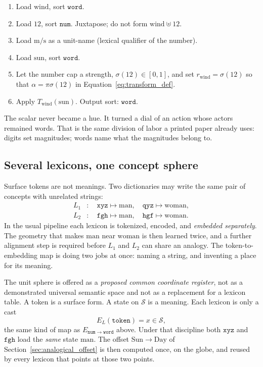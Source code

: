 \documentclass[12pt, a4paper]{article}
\begin{document}
\begin{enumerate}
    \item Load $\mathrm{wind}$, sort $\mathtt{word}$.
    \item Load $12$, sort $\mathtt{num}$. Juxtapose; do not form
          $\mathrm{wind}\uplus 12$.
    \item Load $\mathrm{m/s}$ as a unit-name (lexical qualifier of the
          number).
    \item Load $\mathrm{sun}$, sort $\mathtt{word}$.
    \item Let the number cap a strength,
          $\sigma(12)\in[0,1]$, and set
          $r_{\mathrm{wind}}=\sigma(12)$ so that
          $\alpha=\pi\sigma(12)$ in Equation~\eqref{eq:transform_def}.
    \item Apply $T_{\mathrm{wind}}(\mathrm{sun})$. Output sort:
          $\mathtt{word}$.
\end{enumerate}
The scalar never became a hue. It turned a dial of an action whose
actors remained words. That is the same division of labor a printed
paper already uses: digits set magnitudes; words name what the
magnitudes belong to.

\subsection{Several lexicons, one concept sphere}
\label{subsec:shared_lexicons}
Surface tokens are not meanings. Two dictionaries may write the same
pair of concepts with unrelated strings:
\begin{equation}
    \begin{aligned}
        L_1&: \quad \texttt{xyz}\mapsto\mathrm{man},\quad
                    \texttt{qyz}\mapsto\mathrm{woman},\\
        L_2&: \quad \texttt{fgh}\mapsto\mathrm{man},\quad
                    \texttt{hgf}\mapsto\mathrm{woman}.
    \end{aligned}
    \label{eq:two_lexicons}
\end{equation}
In the usual pipeline each lexicon is tokenized, encoded, and
\emph{embedded separately}. The geometry that makes
$\mathrm{man}$ near $\mathrm{woman}$ is then learned twice, and a
further alignment step is required before $L_1$ and $L_2$ can share
an analogy. The token-to-embedding map is doing two jobs at once:
naming a string, and inventing a place for its meaning.

The unit sphere is offered as a \emph{proposed common coordinate register}, not as a demonstrated universal semantic space and not as a replacement for a lexicon table.
A token is a surface form. A state on $\mathcal{S}$ is a meaning.
Each lexicon is only a cast
\begin{equation}
    E_{L}(\texttt{token}) = x\in\mathcal{S},
    \label{eq:lexicon_cast}
\end{equation}
the same kind of map as $E_{\mathtt{num}\to\mathtt{word}}$ above.
Under that discipline both $\texttt{xyz}$ and $\texttt{fgh}$ load the
\emph{same} state $\mathrm{man}$. The offset
$\mathrm{Sun}\to\mathrm{Day}$ of Section~\ref{sec:analogical_offset}
is then computed once, on the globe, and reused by every lexicon that
points at those two points.
\end{document}

